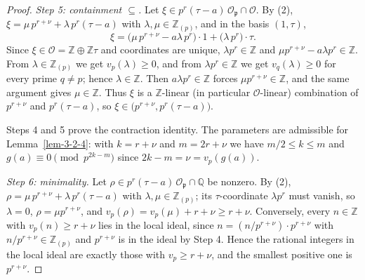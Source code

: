 \begin{proof}
  \emph{Step 5: containment $\subseteq$.} Let
  $\xi \in p^r(\tau - a)\,\mathcal{O}_{\mathfrak{p}} \cap \mathcal{O}$. By
  (2), $\xi = \mu\, p^{r+\nu} + \lambda\, p^r(\tau - a)$ with
  $\lambda, \mu \in \mathbb{Z}_{(p)}$, and in the basis $(1, \tau)$,
  \[
    \xi = \bigl(\mu\, p^{r+\nu} - a\lambda\, p^r\bigr) \cdot 1
        + \bigl(\lambda\, p^r\bigr) \cdot \tau .
  \]
  Since $\xi \in \mathcal{O} = \mathbb{Z} \oplus \mathbb{Z}\tau$ and
  coordinates are unique, $\lambda p^r \in \mathbb{Z}$ and
  $\mu p^{r+\nu} - a\lambda p^r \in \mathbb{Z}$. From
  $\lambda \in \mathbb{Z}_{(p)}$ we get $v_p(\lambda) \geq 0$, and from
  $\lambda p^r \in \mathbb{Z}$ we get $v_q(\lambda) \geq 0$ for every prime
  $q \neq p$; hence $\lambda \in \mathbb{Z}$. Then
  $a \lambda p^r \in \mathbb{Z}$ forces $\mu p^{r+\nu} \in \mathbb{Z}$, and
  the same argument gives $\mu \in \mathbb{Z}$. Thus $\xi$ is a
  $\mathbb{Z}$-linear (in particular $\mathcal{O}$-linear) combination of
  $p^{r+\nu}$ and $p^r(\tau - a)$, so
  $\xi \in \bigl(p^{r+\nu}, p^r(\tau - a)\bigr)$.

  Steps 4 and 5 prove the contraction identity. The parameters are
  admissible for Lemma~\ref{lem-3-2-4}: with $k = r + \nu$ and
  $m = 2r + \nu$ we have $m/2 \leq k \leq m$ and
  $g(a) \equiv 0 \pmod{p^{2k - m}}$ since $2k - m = \nu = v_p(g(a))$.

  \emph{Step 6: minimality.} Let
  $\rho \in p^r(\tau - a)\,\mathcal{O}_{\mathfrak{p}} \cap \mathbb{Q}$ be
  nonzero. By (2), $\rho = \mu\, p^{r+\nu} + \lambda\, p^r(\tau - a)$ with
  $\lambda, \mu \in \mathbb{Z}_{(p)}$; its $\tau$-coordinate $\lambda p^r$
  must vanish, so $\lambda = 0$, $\rho = \mu p^{r+\nu}$, and
  $v_p(\rho) = v_p(\mu) + r + \nu \geq r + \nu$. Conversely, every
  $n \in \mathbb{Z}$ with $v_p(n) \geq r + \nu$ lies in the local ideal,
  since $n = (n / p^{r+\nu}) \cdot p^{r+\nu}$ with
  $n / p^{r+\nu} \in \mathbb{Z}_{(p)}$ and $p^{r+\nu}$ is in the ideal by
  Step 4. Hence the rational integers in the local ideal are exactly those
  with $v_p \geq r + \nu$, and the smallest positive one is $p^{r+\nu}$.
\end{proof}

